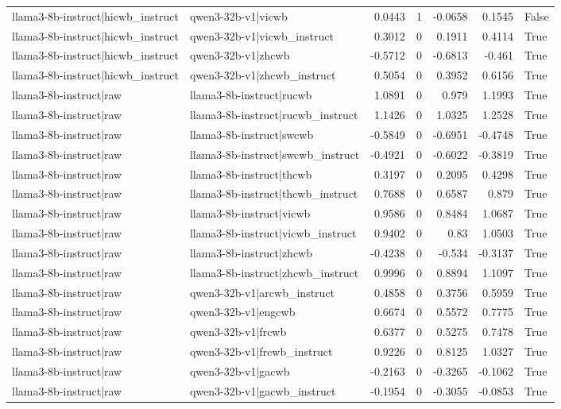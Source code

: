 \begin{table}
\begin{tabular}{l l r r r r l}
llama3-8b-instruct|hicwb_instruct & qwen3-32b-v1|vicwb & 0.0443 & 1 & -0.0658 & 0.1545 & False \\
llama3-8b-instruct|hicwb_instruct & qwen3-32b-v1|vicwb_instruct & 0.3012 & 0 & 0.1911 & 0.4114 & True \\
llama3-8b-instruct|hicwb_instruct & qwen3-32b-v1|zhcwb & -0.5712 & 0 & -0.6813 & -0.461 & True \\
llama3-8b-instruct|hicwb_instruct & qwen3-32b-v1|zhcwb_instruct & 0.5054 & 0 & 0.3952 & 0.6156 & True \\
llama3-8b-instruct|raw & llama3-8b-instruct|rucwb & 1.0891 & 0 & 0.979 & 1.1993 & True \\
llama3-8b-instruct|raw & llama3-8b-instruct|rucwb_instruct & 1.1426 & 0 & 1.0325 & 1.2528 & True \\
llama3-8b-instruct|raw & llama3-8b-instruct|swcwb & -0.5849 & 0 & -0.6951 & -0.4748 & True \\
llama3-8b-instruct|raw & llama3-8b-instruct|swcwb_instruct & -0.4921 & 0 & -0.6022 & -0.3819 & True \\
llama3-8b-instruct|raw & llama3-8b-instruct|thcwb & 0.3197 & 0 & 0.2095 & 0.4298 & True \\
llama3-8b-instruct|raw & llama3-8b-instruct|thcwb_instruct & 0.7688 & 0 & 0.6587 & 0.879 & True \\
llama3-8b-instruct|raw & llama3-8b-instruct|vicwb & 0.9586 & 0 & 0.8484 & 1.0687 & True \\
llama3-8b-instruct|raw & llama3-8b-instruct|vicwb_instruct & 0.9402 & 0 & 0.83 & 1.0503 & True \\
llama3-8b-instruct|raw & llama3-8b-instruct|zhcwb & -0.4238 & 0 & -0.534 & -0.3137 & True \\
llama3-8b-instruct|raw & llama3-8b-instruct|zhcwb_instruct & 0.9996 & 0 & 0.8894 & 1.1097 & True \\
llama3-8b-instruct|raw & qwen3-32b-v1|arcwb_instruct & 0.4858 & 0 & 0.3756 & 0.5959 & True \\
llama3-8b-instruct|raw & qwen3-32b-v1|engcwb & 0.6674 & 0 & 0.5572 & 0.7775 & True \\
llama3-8b-instruct|raw & qwen3-32b-v1|frcwb & 0.6377 & 0 & 0.5275 & 0.7478 & True \\
llama3-8b-instruct|raw & qwen3-32b-v1|frcwb_instruct & 0.9226 & 0 & 0.8125 & 1.0327 & True \\
llama3-8b-instruct|raw & qwen3-32b-v1|gacwb & -0.2163 & 0 & -0.3265 & -0.1062 & True \\
llama3-8b-instruct|raw & qwen3-32b-v1|gacwb_instruct & -0.1954 & 0 & -0.3055 & -0.0853 & True \\

\end{tabular}
\end{table}
